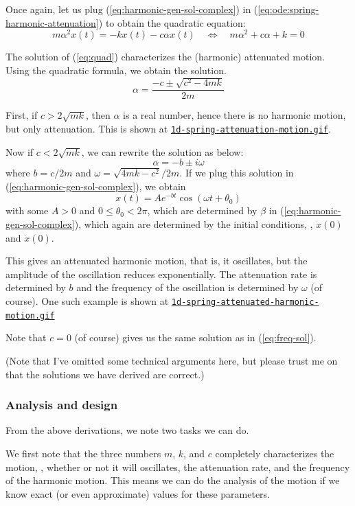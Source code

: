 \documentclass[12pt]{article}
\begin{document}
Once again,
let us plug (\ref{eq:harmonic-gen-sol-complex}) in (\ref{eq:ode:spring-harmonic-attenuation})
to obtain
the quadratic equation:
\begin{equation}
\label{eq:quad}
m \alpha^2 x(t) = -k x(t) - c \alpha x(t)
\quad
\Leftrightarrow
\quad
m \alpha^2 + c \alpha + k = 0
\end{equation}

The solution of (\ref{eq:quad}) characterizes the (harmonic) attenuated motion. Using the quadratic formula,
we obtain the solution.
\[
\alpha = \frac
{-c \pm \sqrt{c^2 - 4mk}}
{2m}
\]

First, if $c > 2\sqrt{mk}$, then $\alpha$ is a real number,
hence there is no harmonic motion, but only attenuation. This is shown at
{\tt \href{https://github.com/sungheeyun/science/blob/main/animations/1d-spring-attenuation-motion.gif}{1d-spring-attenuation-motion.gif}}.

Now if $c<2 \sqrt{mk}$, we can rewrite the solution as below:
\[
\alpha =
-b
\pm
i \omega
\]
where $b= {c}/ {2m}$ and $\omega={\sqrt{4mk-c^2}}/ {2m}$.
If we plug this solution in (\ref{eq:harmonic-gen-sol-complex}),
we obtain
\[
	x(t) =  A e^{-bt} \cos(\omega t + \theta_0)
\]
with some $A>0$ and $0\leq \theta_0 < 2\pi$,
which are determined by $\beta$ in (\ref{eq:harmonic-gen-sol-complex}),
which again are determined by the initial conditions,
\ie,
$x(0)$ and $\dot{x}(0)$.

This gives an attenuated harmonic motion,
that is,
it oscillates, but the amplitude of the oscillation reduces exponentially.
The attenuation rate is determined by $b$
and the frequency of the oscillation is determined by $\omega$ (of course).
One such example is shown at
{\tt \href{https://github.com/sungheeyun/science/blob/main/animations/1d-spring-attenuated-harmonic-motion.gif}{1d-spring-attenuated-harmonic-motion.gif}}

Note that $c=0$ (of course) gives us the same solution as in (\ref{eq:freq-sol}).

(Note that I've omitted some technical arguments here, but please trust me on that
the solutions we have derived are correct.)

\subsubsection{Analysis and design}

From the above derivations,
we note two tasks we can do.

We first note that the three numbers $m$, $k$, and $c$
completely characterizes the motion,
\eg,
whether or not it will oscillates,
the attenuation rate,
and the frequency of the harmonic motion.
This means we can do the analysis of the motion
if we know exact (or even approximate) values for these parameters.
\end{document}
